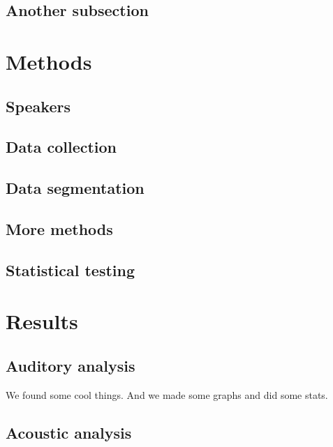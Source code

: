 \documentclass[letter, 12pt]{article} %
\begin{document}
\subsection{Another subsection}




\section{Methods}

\subsection{Speakers}



\subsection{Data collection}



\subsection{Data segmentation}


\subsection{More methods}


\subsection{Statistical testing}




\section{Results}

\subsection{Auditory analysis}

We found some cool things. And we made some graphs and did some stats.


\subsection{Acoustic analysis}
\end{document}
